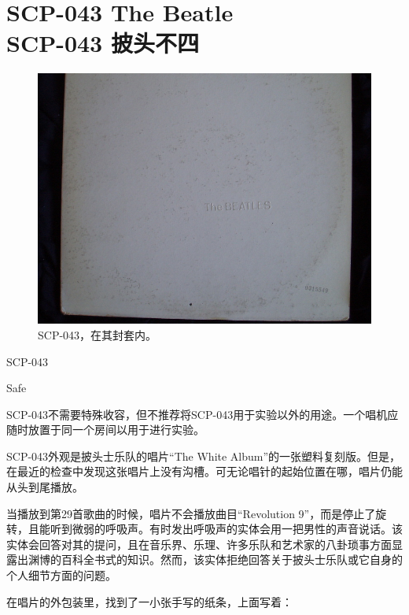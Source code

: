 \chapter[SCP-043 披头不四]{
    SCP-043 The Beatle\\
    SCP-043 披头不四
}

\label{chap:SCP-043}

\begin{figure}[H]
    \centering
    \includegraphics[width=0.5\linewidth]{images/SCP-043.jpg}
    \caption*{SCP-043，在其封套内。}
\end{figure}

SCP-043

Safe

SCP-043不需要特殊收容，但不推荐将SCP-043用于实验以外的用途。一个唱机应随时放置于同一个房间以用于进行实验。

SCP-043外观是披头士乐队的唱片“The White Album”的一张塑料复刻版。但是，在最近的检查中发现这张唱片上没有沟槽。可无论唱针的起始位置在哪，唱片仍能从头到尾播放。

当播放到第29首歌曲的时候，唱片不会播放曲目“Revolution 9”，而是停止了旋转，且能听到微弱的呼吸声。有时发出呼吸声的实体会用一把男性的声音说话。该实体会回答对其的提问，且在音乐界、乐理、许多乐队和艺术家的八卦琐事方面显露出渊博的百科全书式的知识。然而，该实体拒绝回答关于披头士乐队或它自身的个人细节方面的问题。

在唱片的外包装里，找到了一小张手写的纸条，上面写着：

\begin{scpbox}




\end{scpbox}
